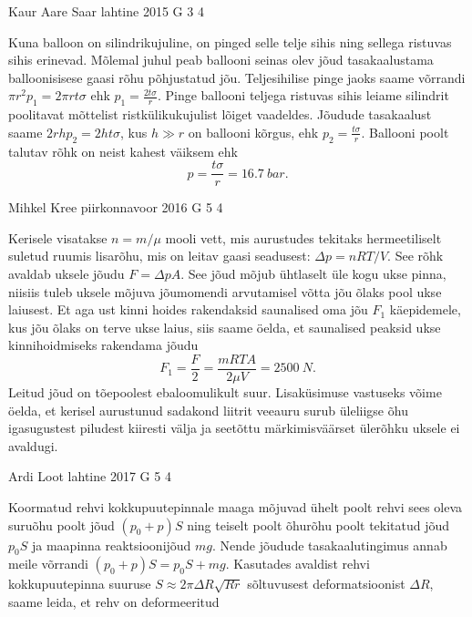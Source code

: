 \documentclass[11pt, twoside]{article}
\begin{document}
{%
{Kaur Aare Saar} %
{lahtine} %
{2015} %
{G 3} %
{4} %
{

\ifSolution
Kuna balloon on silindrikujuline, on pinged selle telje sihis ning sellega ristuvas sihis erinevad. Mõlemal juhul peab ballooni seinas olev jõud tasakaalustama balloonisisese gaasi rõhu põhjustatud jõu. Teljesihilise pinge jaoks saame võrrandi $\pi r^2 p_1=2\pi rt\sigma$ ehk $p_1=\frac{2t\sigma}{r}$. Pinge ballooni teljega ristuvas sihis leiame silindrit poolitavat mõttelist ristkülikukujulist lõiget vaadeldes. Jõudude tasakaalust saame $2rhp_2=2ht\sigma$, kus $h\gg r$ on ballooni kõrgus, ehk $p_2=\frac{t\sigma}{r}$. Ballooni poolt talutav rõhk on neist kahest väiksem ehk
\[
p=\frac{t\sigma}{r}=\SI{16,7}{bar}.
\]
\fi
}

{Mihkel Kree} %
{piirkonnavoor} %
{2016} %
{G 5} %
{4} %
{

\ifSolution
Kerisele visatakse $n=m/\mu$ mooli vett, mis aurustudes tekitaks hermeetiliselt suletud ruumis lisarõhu, mis on leitav gaasi seadusest: $\Delta p = nRT/V$. See rõhk avaldab uksele jõudu $F=\Delta p A$. See jõud mõjub ühtlaselt üle kogu ukse pinna, niisiis tuleb uksele mõjuva jõumomendi arvutamisel võtta jõu õlaks pool ukse laiusest. Et aga ust kinni hoides rakendaksid saunalised oma jõu $F_1$ käepidemele, kus jõu õlaks on terve ukse laius, siis saame öelda, et saunalised peaksid ukse kinnihoidmiseks rakendama jõudu
\[F_1 = \frac{F}{2} = \frac{mRTA}{2 \mu V} = \SI{2500}{N}.\]
Leitud jõud on tõepoolest ebaloomulikult suur. Lisaküsimuse vastuseks võime öelda, et kerisel aurustunud sadakond liitrit veeauru surub üleliigse õhu igasugustest piludest kiiresti välja ja seetõttu märkimisväärset ülerõhku uksele ei avaldugi.
\fi
}

{Ardi Loot} %
{lahtine} %
{2017} %
{G 5} %
{4} %
{

\ifSolution
Koormatud rehvi kokkupuutepinnale maaga mõjuvad ühelt poolt rehvi sees oleva suruõhu poolt jõud $\left(p_{0}+p\right)S$ ning teiselt
poolt õhurõhu poolt tekitatud jõud $p_{0}S$ ja maapinna reaktsioonijõud $mg$. Nende jõudude tasakaalutingimus annab meile võrrandi $\left(p_{0}+p\right)S=p_{0}S+mg.$ Kasutades avaldist rehvi kokkupuutepinna suuruse $S\approx2\pi\Delta R\sqrt{Rr}$ sõltuvusest deformatsioonist $\Delta R$, saame leida, et rehv on deformeeritud

}}
\end{document}
